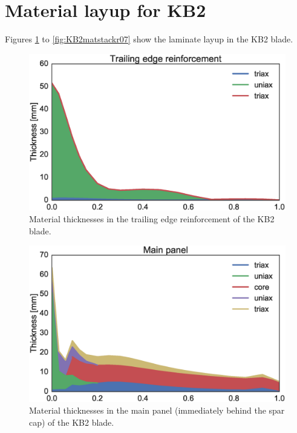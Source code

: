 \section{Material layup for KB2}
Figures \ref{fig:KB2matstackr01} to \ref{fig:KB2matstackr07} show the laminate layup in the KB2 blade.

\begin{figure}[pth]
\begin{center}
	\includegraphics[width=.85\linewidth]{figures/KB2_region01.eps}
\end{center}
\caption{Material thicknesses in the trailing edge reinforcement of the KB2 blade.}
\label{fig:KB2matstackr01}
\end{figure}

\begin{figure}[pth]
\begin{center}
	\includegraphics[width=.85\linewidth]{figures/KB2_region02.eps}
\end{center}
\caption{Material thicknesses in the main panel (immediately behind the spar cap) of the KB2 blade.}
\label{fig:KB2matstackr02}
\end{figure}

